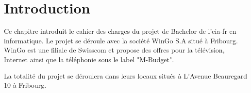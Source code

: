 
\chapter{Introduction}
Ce chapitre introduit le cahier des charges du projet de Bachelor de l'eia-fr en informatique. Le projet se déroule avec la société WinGo S.A situé à Fribourg. WinGo est une filiale de Swisscom et propose des offres pour la télévision, Internet ainsi que la téléphonie sous le label "M-Budget".

La totalité du projet se déroulera dans leurs locaux situés à L'Avenue Beauregard 10 à Fribourg.

